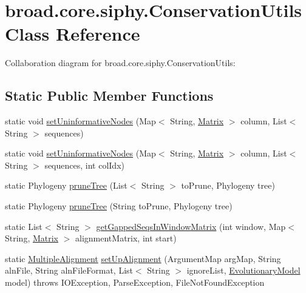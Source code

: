 \hypertarget{classbroad_1_1core_1_1siphy_1_1_conservation_utils}{\section{broad.\+core.\+siphy.\+Conservation\+Utils Class Reference}
\label{classbroad_1_1core_1_1siphy_1_1_conservation_utils}
}


Collaboration diagram for broad.\+core.\+siphy.\+Conservation\+Utils\+:
\subsection*{Static Public Member Functions}
\begin{DoxyCompactItemize}
\item 
static void \hyperlink{classbroad_1_1core_1_1siphy_1_1_conservation_utils_a2918cf4bdea98feed68a7dc80f58c43a}{set\+Uninformative\+Nodes} (Map$<$ String, \hyperlink{class_jama_1_1_matrix}{Matrix} $>$ column, List$<$ String $>$ sequences)
\item 
static void \hyperlink{classbroad_1_1core_1_1siphy_1_1_conservation_utils_a3e67d62373ffaf349c1f2885dbb4a1ac}{set\+Uninformative\+Nodes} (Map$<$ String, \hyperlink{class_jama_1_1_matrix}{Matrix} $>$ column, List$<$ String $>$ sequences, int col\+Idx)
\item 
static Phylogeny \hyperlink{classbroad_1_1core_1_1siphy_1_1_conservation_utils_a4e88229bea6626fc964ced0e88511004}{prune\+Tree} (List$<$ String $>$ to\+Prune, Phylogeny tree)
\item 
static Phylogeny \hyperlink{classbroad_1_1core_1_1siphy_1_1_conservation_utils_a4d1f0a461a649310b8acc04856be0886}{prune\+Tree} (String to\+Prune, Phylogeny tree)
\item 
static List$<$ String $>$ \hyperlink{classbroad_1_1core_1_1siphy_1_1_conservation_utils_a9f75501f2ed4d9bbc09461319aa1729c}{get\+Gapped\+Seqs\+In\+Window\+Matrix} (int window, Map$<$ String, \hyperlink{class_jama_1_1_matrix}{Matrix} $>$ alignment\+Matrix, int start)
\item 
static \hyperlink{classbroad_1_1core_1_1multiplealignment_1_1_multiple_alignment}{Multiple\+Alignment} \hyperlink{classbroad_1_1core_1_1siphy_1_1_conservation_utils_ab3eecb49e17d4de98098b5b85d53dcf4}{set\+Up\+Alignment} (Argument\+Map arg\+Map, String aln\+File, String aln\+File\+Format, List$<$ String $>$ ignore\+List, \hyperlink{classbroad_1_1core_1_1siphy_1_1_evolutionary_model}{Evolutionary\+Model} model)  throws I\+O\+Exception, Parse\+Exception,	\+File\+Not\+Found\+Exception 

\end{DoxyCompactItemize}
